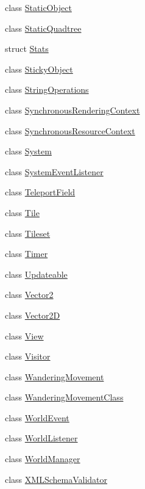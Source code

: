 \begin{DoxyCompactItemize}
class \hyperlink{classZeta_1_1StaticObject}{Static\+Object}
\item 
class \hyperlink{classZeta_1_1StaticQuadtree}{Static\+Quadtree}
\item 
struct \hyperlink{structZeta_1_1Stats}{Stats}
\item 
class \hyperlink{classZeta_1_1StickyObject}{Sticky\+Object}
\item 
class \hyperlink{classZeta_1_1StringOperations}{String\+Operations}
\item 
class \hyperlink{classZeta_1_1SynchronousRenderingContext}{Synchronous\+Rendering\+Context}
\item 
class \hyperlink{classZeta_1_1SynchronousResourceContext}{Synchronous\+Resource\+Context}
\item 
class \hyperlink{classZeta_1_1System}{System}
\item 
class \hyperlink{classZeta_1_1SystemEventListener}{System\+Event\+Listener}
\item 
class \hyperlink{classZeta_1_1TeleportField}{Teleport\+Field}
\item 
class \hyperlink{classZeta_1_1Tile}{Tile}
\item 
class \hyperlink{classZeta_1_1Tileset}{Tileset}
\item 
class \hyperlink{classZeta_1_1Timer}{Timer}
\item 
class \hyperlink{classZeta_1_1Updateable}{Updateable}
\item 
class \hyperlink{classZeta_1_1Vector2}{Vector2}
\item 
class \hyperlink{classZeta_1_1Vector2D}{Vector2\+D}
\item 
class \hyperlink{classZeta_1_1View}{View}
\item 
class \hyperlink{classZeta_1_1Visitor}{Visitor}
\item 
class \hyperlink{classZeta_1_1WanderingMovement}{Wandering\+Movement}
\item 
class \hyperlink{classZeta_1_1WanderingMovementClass}{Wandering\+Movement\+Class}
\item 
class \hyperlink{classZeta_1_1WorldEvent}{World\+Event}
\item 
class \hyperlink{classZeta_1_1WorldListener}{World\+Listener}
\item 
class \hyperlink{classZeta_1_1WorldManager}{World\+Manager}
\item 
class \hyperlink{classZeta_1_1XMLSchemaValidator}{X\+M\+L\+Schema\+Validator}
\end{DoxyCompactItemize}
